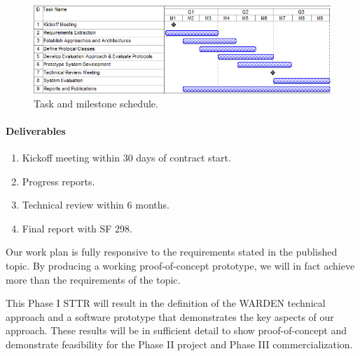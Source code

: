 \documentclass{sbir}
\begin{document}
\begin{figure}[h]
 \centerline{\includegraphics[width=5in]{./images/AF13-AT08_Gantt_Chart.png}}
 \caption{Task and milestone schedule.}
 \label{Gantt}
\end{figure}

\paragraph{Deliverables}
\begin{enumerate}[label=\alph*.] 
\vspace{-0.1in}
\item Kickoff meeting within 30 days of contract start.
\item Progress reports.
\item Technical review within 6 months.
\item Final report with SF 298.
\end{enumerate}

Our work plan is fully responsive to the requirements stated in the published topic. By producing a working proof-of-concept prototype, we will in fact achieve more than the requirements of the topic.

\newpage
{}

{This Phase I STTR will result in the definition of the WARDEN technical approach and a software prototype that demonstrates the key aspects of our approach. These results will be in sufficient detail to show proof-of-concept and demonstrate feasibility for the Phase II project and Phase III commercialization.}
\end{document}
